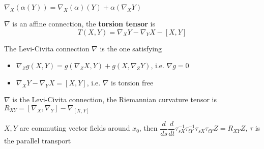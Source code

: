 \documentclass[main]{subfiles}
\begin{document}
\begin{note}
$\nabla_X(\alpha(Y))=\nabla_X(\alpha)(Y)+\alpha(\nabla_XY)$
\end{note}

\begin{definition}
$\nabla$ is an affine connection, the \textbf{torsion tensor} is
\[T(X,Y)=\nabla_XY-\nabla_YX-[X,Y]\]
\end{definition}

\begin{definition}
The Levi-Civita connection $\nabla$ is the one satisfying
\begin{itemize}
\item $\nabla_Zg(X,Y)=g(\nabla_ZX,Y)+g(X,\nabla_ZY)$, i.e. $\nabla g=0$
\item $\nabla_XY-\nabla_YX=[X,Y]$, i.e. $\nabla$ is torsion free
\end{itemize}
\end{definition}

\begin{definition}
$\nabla$ is the Levi-Civita connection, the Riemannian curvature tensor is $R_{XY}=[\nabla_X,\nabla_Y]-\nabla_{[X,Y]}$
\end{definition}

\begin{remark}
$X,Y$ are commuting vector fields around $x_0$, then $\dfrac{d}{ds}\dfrac{d}{dt}\tau_{sX}^{-1}\tau_{tY}^{-1}\tau_{sX}\tau_{tY}Z=R_{XY}Z$, $\tau$ is the parallel transport
\begin{figure}[h!]
\centering
{}
\end{figure}
\end{remark}
\end{document}
